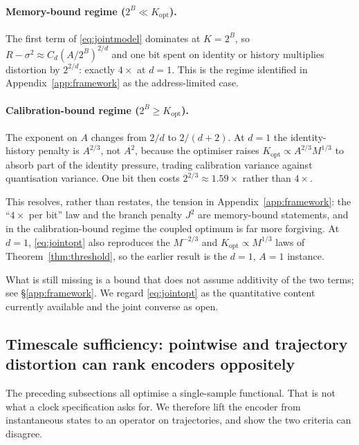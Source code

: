 \documentclass[11pt]{article}
\begin{document}
\paragraph{Memory-bound regime ($2^{B}\ll K_{\mathrm{opt}}$).} The first term of
\eqref{eq:jointmodel} dominates at $K=2^{B}$, so $R-\sigma^{2}\approx
C_d(A/2^{B})^{2/d}$ and one bit spent on identity or history multiplies distortion by
$2^{2/d}$: exactly $4\times$ at $d=1$. This is the regime identified in
Appendix~\ref{app:framework} as the address-limited case.

\paragraph{Calibration-bound regime ($2^{B}\ge K_{\mathrm{opt}}$).} The exponent on $A$
changes from $2/d$ to $2/(d+2)$. At $d=1$ the identity-history penalty is
$A^{2/3}$, not $A^{2}$, because the optimiser raises
$K_{\mathrm{opt}}\propto A^{2/3}M^{1/3}$ to absorb part of the identity pressure, trading
calibration variance against quantisation variance. One bit then costs
$2^{2/3}\approx1.59\times$ rather than $4\times$.

This resolves, rather than restates, the tension in Appendix~\ref{app:framework}: the
``$4\times$ per bit'' law and the branch penalty $J^{2}$ are memory-bound statements, and in
the calibration-bound regime the coupled optimum is far more forgiving. At $d=1$,
\eqref{eq:jointopt} also reproduces the $M^{-2/3}$ and $K_{\mathrm{opt}}\propto M^{1/3}$
laws of Theorem~\ref{thm:threshold}, so the earlier result is the $d=1$, $A=1$ instance.

What is still missing is a bound that does not assume additivity of the two terms; see
\S\ref{app:framework}. We regard \eqref{eq:jointopt} as the quantitative content currently
available and the joint converse as open.

\subsection{Timescale sufficiency: pointwise and trajectory distortion can rank encoders oppositely}

The preceding subsections all optimise a single-sample functional. That is not what a clock
specification asks for. We therefore lift the encoder from instantaneous states to an
operator on trajectories, and show the two criteria can disagree.
\end{document}
